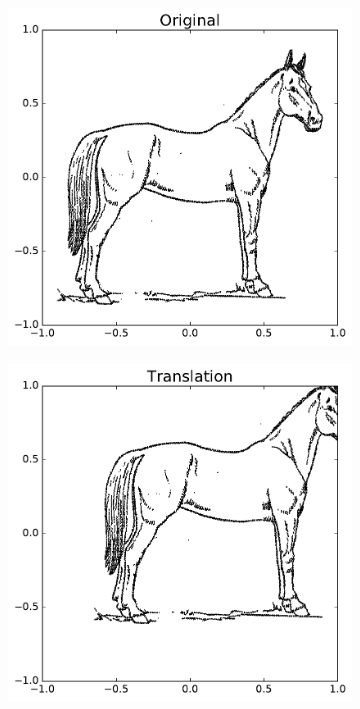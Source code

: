 \begin{figure}[H] %
\captionsetup[subfigure]{justification=centering}
\centering
\begin{subfigure}{.5\textwidth}
    \centering
    \includegraphics[width=\linewidth]{originalHorse.pdf}
\end{subfigure}%
\begin{subfigure}{.5\textwidth}
    \centering
    \includegraphics[width=\linewidth]{TranslationHorse.pdf}
\end{subfigure}
\end{figure}

